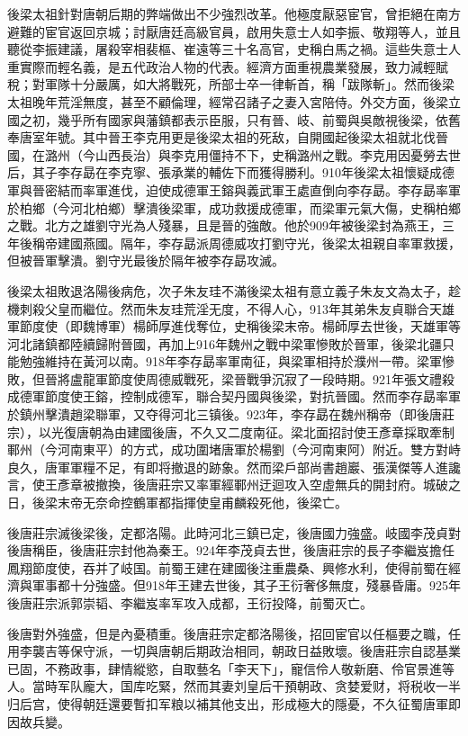 後梁太祖針對唐朝后期的弊端做出不少強烈改革。他極度厭惡宦官，曾拒絕在南方避難的宦官返回京城；討厭唐廷高級官員，啟用失意士人如李振、敬翔等人，並且聽從李振建議，屠殺宰相裴樞、崔遠等三十名高官，史稱白馬之禍。這些失意士人重實際而輕名義，是五代政治人物的代表。經濟方面重視農業發展，致力減輕賦稅；對軍隊十分嚴厲，如大將戰死，所部士卒一律斬首，稱「跋隊斬」。然而後梁太祖晚年荒淫無度，甚至不顧倫理，經常召諸子之妻入宮陪侍。外交方面，後梁立國之初，幾乎所有國家與藩鎮都表示臣服，只有晉、岐、前蜀與吳敵視後梁，依舊奉唐室年號。其中晉王李克用更是後梁太祖的死敌，自開國起後梁太祖就北伐晉國，在潞州（今山西長治）與李克用僵持不下，史稱潞州之戰。李克用因憂勞去世后，其子李存勗在李克寧、張承業的輔佐下而獲得勝利。910年後梁太祖懷疑成德軍與晉密結而率軍進伐，迫使成德軍王鎔與義武軍王處直倒向李存勗。李存勗率軍於柏鄉（今河北柏鄉）擊潰後梁軍，成功救援成德軍，而梁軍元氣大傷，史稱柏鄉之戰。北方之雄劉守光為人殘暴，且是晉的強敵。他於909年被後梁封為燕王，三年後稱帝建國燕國。隔年，李存勗派周德威攻打劉守光，後梁太祖親自率軍救援，但被晉軍擊潰。劉守光最後於隔年被李存勗攻滅。

後梁太祖敗退洛陽後病危，次子朱友珪不滿後梁太祖有意立義子朱友文為太子，趁機刺殺父皇而繼位。然而朱友珪荒淫无度，不得人心，913年其弟朱友貞聯合天雄軍節度使（即魏博軍）楊師厚進伐奪位，史稱後梁末帝。楊師厚去世後，天雄軍等河北諸鎮都陸續歸附晉國，再加上916年魏州之戰中梁軍慘敗於晉軍，後梁北疆只能勉強維持在黃河以南。918年李存勗率軍南征，與梁軍相持於濮州一帶。梁軍慘敗，但晉將盧龍軍節度使周德威戰死，梁晉戰爭沉寂了一段時期。921年張文禮殺成德軍節度使王鎔，控制成德军，聯合契丹國與後梁，對抗晉國。然而李存勗率軍於鎮州擊潰趙梁聯軍，又夺得河北三镇後。923年，李存勗在魏州稱帝（即後唐莊宗），以光復唐朝為由建國後唐，不久又二度南征。梁北面招討使王彥章採取牽制鄆州（今河南東平）的方式，成功圍堵唐軍於楊劉（今河南東阿）附近。雙方對峙良久，唐軍軍糧不足，有即将撤退的跡象。然而梁戶部尚書趙巖、張漢傑等人進讒言，使王彥章被撤換，後唐莊宗又率軍經鄆州迂迴攻入空虛無兵的開封府。城破之日，後梁末帝无奈命控鶴軍都指揮使皇甫麟殺死他，後梁亡。

後唐莊宗滅後梁後，定都洛陽。此時河北三鎮已定，後唐國力強盛。岐國李茂貞對後唐稱臣，後唐莊宗封他為秦王。924年李茂貞去世，後唐莊宗的長子李繼岌擔任鳳翔節度使，吞并了岐国。前蜀王建在建國後注重農桑、興修水利，使得前蜀在經濟與軍事都十分強盛。但918年王建去世後，其子王衍奢侈無度，殘暴昏庸。925年後唐莊宗派郭崇韬、李繼岌率军攻入成都，王衍投降，前蜀灭亡。

後唐對外強盛，但是內憂積重。後唐莊宗定都洛陽後，招回宦官以任樞要之職，任用李襲吉等保守派，一切與唐朝后期政治相同，朝政日益敗壞。後唐莊宗自認基業已固，不務政事，肆情縱慾，自取藝名「李天下」，寵信伶人敬新磨、伶官景進等人。當時军队龐大，国库吃緊，然而其妻刘皇后干預朝政、贪婪爱财，将税收一半归后宫，使得朝廷還要暫扣军粮以補其他支出，形成極大的隱憂，不久征蜀唐軍即因故兵變。

